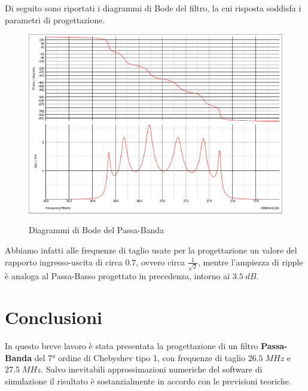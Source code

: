 \documentclass[a4paper,12pt]{report}
\begin{document}
Di seguito sono riportati i diagrammi di Bode del filtro, la cui risposta soddisfa i parametri di progettazione.

\begin{figure}[!htb]
	\centering
	\includegraphics[width=.7\textwidth]{bodeesame21.pdf}
	\label{lell}
	\caption{\label{koklw} \small Diagrammi di Bode del Passa-Banda}
\end{figure}

Abbiamo infatti alle frequenze di taglio usate per la progettazione un valore del rapporto ingresso-uscita di circa $0.7$, ovvero circa $\frac{1}{\sqrt{2}}$, mentre l'ampiezza di ripple è analoga al Passa-Basso progettato in precedenza, intorno ai $3.5 \; dB$.

\section{Conclusioni}

In questo breve lavoro è stata presentata la progettazione di un filtro \textbf{Passa-Banda} del 7° ordine di Chebyshev tipo 1, con frequenze di taglio $26.5 \; MHz$ e $27.5 \; MHz$. 
Salvo inevitabili approssimazioni numeriche del software di simulazione il risultato è sostanzialmente in accordo con le previsioni teoriche.
\end{document}
